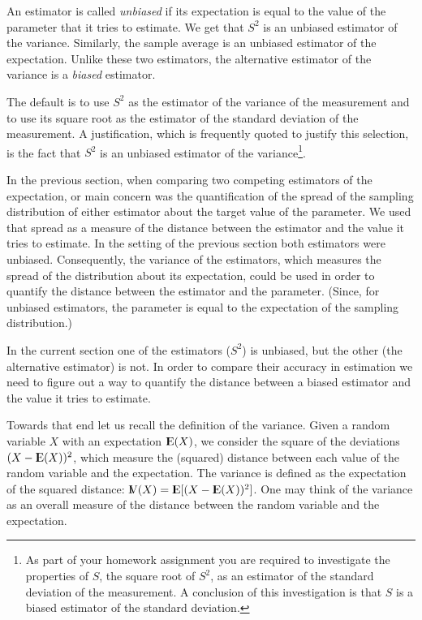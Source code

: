 \documentclass[]{krantz}
\newcommand{\Expec}{{\rm I\kern-.3em E}}
\newcommand{\Var}{{\rm I\kern-.3em V}}
\theoremstyle{definition}
\theoremstyle{definition}
\theoremstyle{definition}
\theoremstyle{remark}
\begin{document}
An estimator is called \emph{unbiased} if its expectation is equal to
the value of the parameter that it tries to estimate. We get that
\(S^2\) is an unbiased estimator of the variance. Similarly, the sample
average is an unbiased estimator of the expectation. Unlike these two
estimators, the alternative estimator of the variance is a \emph{biased}
estimator.

The default is to use \(S^2\) as the estimator of the variance of the
measurement and to use its square root as the estimator of the standard
deviation of the measurement. A justification, which is frequently
quoted to justify this selection, is the fact that \(S^2\) is an
unbiased estimator of the variance\footnote{As part of your homework
  assignment you are required to investigate the properties of \(S\),
  the square root of \(S^2\), as an estimator of the standard deviation
  of the measurement. A conclusion of this investigation is that \(S\)
  is a biased estimator of the standard deviation.}.

In the previous section, when comparing two competing estimators of the
expectation, or main concern was the quantification of the spread of the
sampling distribution of either estimator about the target value of the
parameter. We used that spread as a measure of the distance between the
estimator and the value it tries to estimate. In the setting of the
previous section both estimators were unbiased. Consequently, the
variance of the estimators, which measures the spread of the
distribution about its expectation, could be used in order to quantify
the distance between the estimator and the parameter. (Since, for
unbiased estimators, the parameter is equal to the expectation of the
sampling distribution.)

In the current section one of the estimators (\(S^2\)) is unbiased, but
the other (the alternative estimator) is not. In order to compare their
accuracy in estimation we need to figure out a way to quantify the
distance between a biased estimator and the value it tries to estimate.

Towards that end let us recall the definition of the variance. Given a
random variable \(X\) with an expectation \(\Expec(X)\), we consider the
square of the deviations \((X - \Expec(X))^2\), which measure the
(squared) distance between each value of the random variable and the
expectation. The variance is defined as the expectation of the squared
distance: \(\Var(X) = \Expec[(X-\Expec(X))^2]\). One may think of the
variance as an overall measure of the distance between the random
variable and the expectation.
\end{document}

